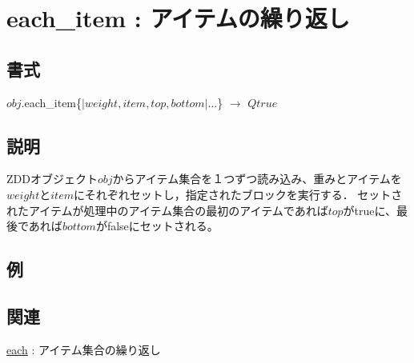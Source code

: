 
\section{each\_item : アイテムの繰り返し\label{sect:each_item}}
\subsection*{書式}
$obj$.each\_item\{$|weight,item,top,bottom|\dots$\} $\rightarrow$ $Qtrue$

\subsection*{説明}
ZDDオブジェクト$obj$からアイテム集合を１つずつ読み込み、重みとアイテムを$weight$と$item$にそれぞれセットし，指定されたブロックを実行する．
セットされたアイテムが処理中のアイテム集合の最初のアイテムであれば$top$がtrueに、最後であれば$bottom$がfalseにセットされる。

\subsection*{例}


\subsection*{関連}
\hyperref[sect:each]{each} : アイテム集合の繰り返し
